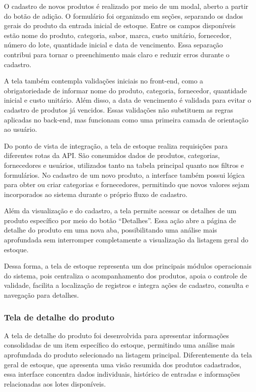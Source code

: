 O cadastro de novos produtos é realizado por meio de um modal, aberto a partir do botão de adição. O formulário foi organizado em seções, separando os dados gerais do produto da entrada inicial de estoque. Entre os campos disponíveis estão nome do produto, categoria, sabor, marca, custo unitário, fornecedor, número do lote, quantidade inicial e data de vencimento. Essa separação contribui para tornar o preenchimento mais claro e reduzir erros durante o cadastro.

A tela também contempla validações iniciais no front-end, como a obrigatoriedade de informar nome do produto, categoria, fornecedor, quantidade inicial e custo unitário. Além disso, a data de vencimento é validada para evitar o cadastro de produtos já vencidos. Essas validações não substituem as regras aplicadas no back-end, mas funcionam como uma primeira camada de orientação ao usuário.

Do ponto de vista de integração, a tela de estoque realiza requisições para diferentes rotas da API. São consumidos dados de produtos, categorias, fornecedores e usuários, utilizados tanto na tabela principal quanto nos filtros e formulários. No cadastro de um novo produto, a interface também possui lógica para obter ou criar categorias e fornecedores, permitindo que novos valores sejam incorporados ao sistema durante o próprio fluxo de cadastro.

Além da visualização e do cadastro, a tela permite acessar os detalhes de um produto específico por meio do botão ``Detalhes''. Essa ação abre a página de detalhe do produto em uma nova aba, possibilitando uma análise mais aprofundada sem interromper completamente a visualização da listagem geral do estoque.

Dessa forma, a tela de estoque representa um dos principais módulos operacionais do sistema, pois centraliza o acompanhamento dos produtos, apoia o controle de validade, facilita a localização de registros e integra ações de cadastro, consulta e navegação para detalhes.

\subsubsection{Tela de detalhe do produto}

A tela de detalhe do produto foi desenvolvida para apresentar informações consolidadas de um item específico do estoque, permitindo uma análise mais aprofundada do produto selecionado na listagem principal. Diferentemente da tela geral de estoque, que apresenta uma visão resumida dos produtos cadastrados, essa interface concentra dados individuais, histórico de entradas e informações relacionadas aos lotes disponíveis.

